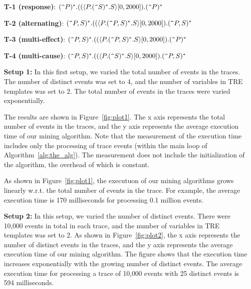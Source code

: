 \documentclass[]{sigplanconf}
\begin{document}
\noindent \textbf{T-1 (response)}: $(\verb!^!P)^*.((\langle P.(\verb!^!S)^*.S\rangle[0, 2000]).(\verb!^!P)^*$

\noindent \textbf{T-2 (alternating)}: $(\verb!^!P,S)^*.((\langle P.(\verb!^!P,S)^*.S\rangle[0, 2000]).(\verb!^!P,S)^*$

\noindent \textbf{T-3 (multi-effect)}: $(\verb!^!P,S)^*.((\langle P.(\verb!^!P,S)^*.S\rangle[0, 2000]).(\verb!^!P)^*$

\noindent \textbf{T-4 (multi-cause)}: $(\verb!^!P,S)^*.((\langle P.(\verb!^!S)^*.S\rangle[0, 2000]).(\verb!^!P,S)^*$


\vspace{3mm}

\noindent \textbf{Setup 1:}
In this first setup, we varied the total number of events in the traces. The number of distinct events was set to 4, and the number of variables in TRE templates was set to 2. The total number of events in the traces were varied exponentially.

The results are shown in Figure~\ref{fig:plot1}. The x axis represents the total number of events in the traces, and the y axis represents the average execution time of our mining algorithm. Note that the measurement of the execution time includes only the processing of trace events (within the main loop of Algorithm~\ref{alg:the_alg}). The measurement does not include the initialization of the algorithm, the overhead of which is constant.

As shown in Figure~\ref{fig:plot1}, the executuon of our mining algorithms grows linearly w.r.t. the total number of events in the trace. For example, the average execution time is 170 milliseconds for processing 0.1 million events.

\vspace{3mm}

\noindent \textbf{Setup 2:}
In this setup, we varied the number of distinct events. There were 10,000 events in total in each trace, and the number of variables in TRE templates was set to 2. As shown in Figure~\ref{fig:plot2}, the x axis represents the number of distinct events in the traces, and the y axis represents the average execution time of our mining algorithm. The figure shows that the execution time increases exponentially with the growing number of distinct events. The average execution time for processing a trace of 10,000 events with 25 distinct events is 594 milliseconds.

\vspace{3mm}
\end{document}
